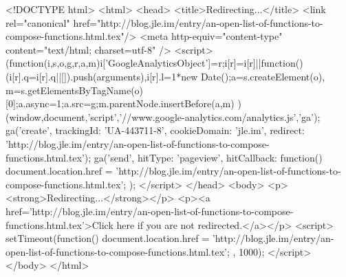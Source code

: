 <!DOCTYPE html>
<html>
<head>
<title>Redirecting...</title>
<link rel="canonical" href="http://blog.jle.im/entry/an-open-list-of-functions-to-compose-functions.html.tex"/>
<meta http-equiv="content-type" content="text/html; charset=utf-8" />
<script>
(function(i,s,o,g,r,a,m){i['GoogleAnalyticsObject']=r;i[r]=i[r]||function(){
(i[r].q=i[r].q||[]).push(arguments)},i[r].l=1*new Date();a=s.createElement(o),
m=s.getElementsByTagName(o)[0];a.async=1;a.src=g;m.parentNode.insertBefore(a,m)
})(window,document,'script','//www.google-analytics.com/analytics.js','ga');
ga('create', { trackingId: 'UA-443711-8', cookieDomain: 'jle.im', redirect: 'http://blog.jle.im/entry/an-open-list-of-functions-to-compose-functions.html.tex'});
ga('send', { hitType: 'pageview', hitCallback: function() { document.location.href = 'http://blog.jle.im/entry/an-open-list-of-functions-to-compose-functions.html.tex'; } });
</script>
</head>
<body>
  <p><strong>Redirecting...</strong></p>
  <p><a href='http://blog.jle.im/entry/an-open-list-of-functions-to-compose-functions.html.tex'>Click here if you are not redirected.</a></p>
  <script>
    setTimeout(function() { document.location.href = 'http://blog.jle.im/entry/an-open-list-of-functions-to-compose-functions.html.tex'; }, 1000);
  </script>
</body>
</html>
